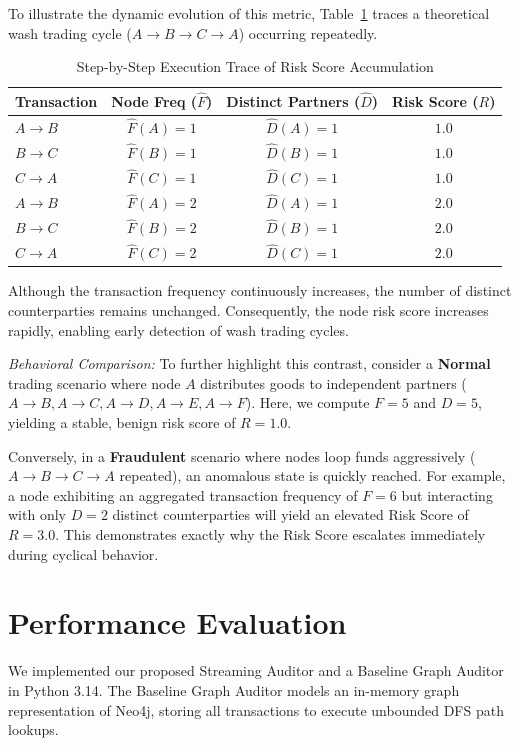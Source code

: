 \documentclass[conference]{IEEEtran}
\begin{document}
To illustrate the dynamic evolution of this metric, Table~\ref{tab_risk_trace} traces a theoretical wash trading cycle ($A \to B \to C \to A$) occurring repeatedly.

\begin{table}[htbp]
\caption{Step-by-Step Execution Trace of Risk Score Accumulation}
\label{tab_risk_trace}
\centering
\begin{tabular}{@{}lccc@{}}
\toprule
\textbf{Transaction} & \textbf{Node Freq ($\hat{F}$)} & \textbf{Distinct Partners ($\hat{D}$)} & \textbf{Risk Score ($R$)} \\ \midrule
$A \to B$ & $\hat{F}(A)=1$ & $\hat{D}(A)=1$ & $1.0$ \\
$B \to C$ & $\hat{F}(B)=1$ & $\hat{D}(B)=1$ & $1.0$ \\
$C \to A$ & $\hat{F}(C)=1$ & $\hat{D}(C)=1$ & $1.0$ \\
$A \to B$ & $\hat{F}(A)=2$ & $\hat{D}(A)=1$ & $2.0$ \\
$B \to C$ & $\hat{F}(B)=2$ & $\hat{D}(B)=1$ & $2.0$ \\
$C \to A$ & $\hat{F}(C)=2$ & $\hat{D}(C)=1$ & $2.0$ \\ \bottomrule
\end{tabular}
\end{table}

Although the transaction frequency continuously increases, the number of distinct counterparties remains unchanged. Consequently, the node risk score increases rapidly, enabling early detection of wash trading cycles.

\textit{Behavioral Comparison:}
To further highlight this contrast, consider a \textbf{Normal} trading scenario where node $A$ distributes goods to independent partners ($A \to B, A \to C, A \to D, A \to E, A \to F$). Here, we compute $F = 5$ and $D = 5$, yielding a stable, benign risk score of $R = 1.0$.

Conversely, in a \textbf{Fraudulent} scenario where nodes loop funds aggressively ($A \to B \to C \to A$ repeated), an anomalous state is quickly reached. For example, a node exhibiting an aggregated transaction frequency of $F = 6$ but interacting with only $D = 2$ distinct counterparties will yield an elevated Risk Score of $R = 3.0$. This demonstrates exactly why the Risk Score escalates immediately during cyclical behavior.

\section{Performance Evaluation}
We implemented our proposed Streaming Auditor and a Baseline Graph Auditor in Python 3.14. The Baseline Graph Auditor models an in-memory graph representation of Neo4j, storing all transactions to execute unbounded DFS path lookups.
\end{document}
